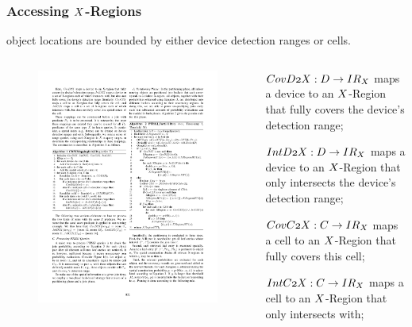 \begin{frame}
\frametitle{Accessing $\mathnormal{X}$-Regions}

\textrm{object locations are bounded by either device detection ranges or cells.}

\begin{columns}[c]

  \begin{figure}[tb]
    \includegraphics[width=\columnwidth]{figures/2-4/2-4-6.pdf}
  \end{figure}

  \begin{sitemize}
    \item $\mathnormal{CovD2X: D \rightarrow IR_X}$ maps a device to an $\mathnormal{X}$-Region that fully covers the device's detection range;
    \item $\mathnormal{IntD2X: D \rightarrow IR_X}$ maps a device to an $\mathnormal{X}$-Region that only intersects the device's detection range;
    \item $\mathnormal{CovC2X: C \rightarrow IR_X}$ maps a cell to an $\mathnormal{X}$-Region that fully covers this cell;
    \item $\mathnormal{IntC2X: C \rightarrow IR_X}$ maps a cell to an $\mathnormal{X}$-Region that only intersects with;
  \end{sitemize}

\end{columns}

\end{frame}


